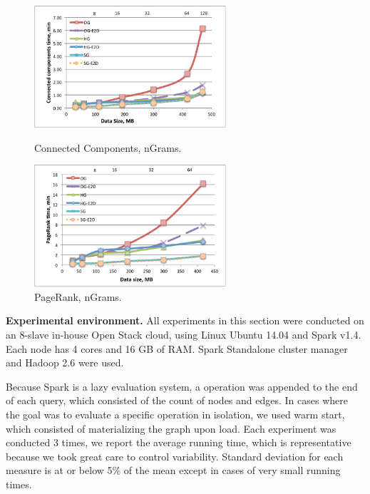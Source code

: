 \begin{figure}[t]
\centering
\begin{minipage}{3.3in}
  \centering
  \includegraphics[width=2.8in]{figs/connectedcs_ngrams.pdf}
  \vspace{-0.1in}
  \caption{Connected Components, nGrams.}
  \label{fig:connectc_ngrams}
  \vspace{-0.5cm}
\end{minipage}
\begin{minipage}{3.3in}
  \centering
\includegraphics[width=2.8in]{figs/pagerank_ngrams.pdf}
  \vspace{-0.1in}
\caption{PageRank, nGrams.}
\label{fig:pagerank_ngrams}
  \vspace{-0.5cm}
\end{minipage}
\end{figure}

{\bf Experimental environment.} All experiments in this section were
conducted on an 8-slave in-house Open Stack cloud, using Linux Ubuntu
14.04 and Spark v1.4.  Each node has 4 cores and 16 GB of RAM.  Spark
Standalone cluster manager and Hadoop 2.6 were used.

Because Spark is a lazy evaluation system, a 
operation was appended to the end of each query, which consisted of
the count of nodes and edges.  In cases where the goal was to evaluate
a specific operation in isolation, we used warm start, which consisted
of materializing the graph upon load.  Each experiment was conducted 3
times, we report the average running time, which is representative
because we took great care to control variability.  Standard deviation
for each measure is at or below 5\% of the mean except in cases of
very small running times.

